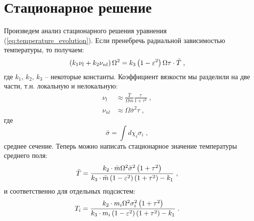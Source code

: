 \section{Стационарное решение}
Произведем анализ стационарного решения уравнения (\ref{eq:temperature_evolution}). Если пренебречь радиальной зависимостью
температуры, то получаем:
\begin{equation}
    \left(k_1\nu_{l}+k_2\nu_{nl}\right)\Omega^2=k_3\left(1-\varepsilon^2\right)\Omega\tau\cdot\bar{T}\;,
\end{equation}
где $k_1,\,k_2,\,k_3$ -- некоторые константы. Коэффициент вязкости мы разделили на две части, т.н. локальную и нелокальную:
\begin{equation}
    \begin{split}
        \nu_{l}&\approx\frac{\bar{T}}{\Omega\bar{m}}\frac{\tau}{1+\tau^2}\;,\\
        \nu_{nl}&\approx\Omega\bar{\sigma}^2\tau\;,
    \end{split}
\end{equation}
где
\begin{equation}
  \bar{\sigma}=\int d\chi_i\sigma_i\;,
\end{equation}
среднее сечение. Теперь можно написать стационарное значение температуры среднего поля:
\begin{equation}
    \bar{T} = \frac{k_2\cdot\bar{m}\Omega^2\bar{\sigma}^2\left(1+\tau^2\right)}{k_3\cdot\bar{m}\left(1-\varepsilon^2\right)\left(1+\tau^2\right)-k_1}\;,
\end{equation}
и соответственно для отдельных подсистем:
\begin{equation}
    T_{i} = \frac{k_2\cdot m_i\Omega^2\sigma_i^2\left(1+\tau^2\right)}{k_3\cdot m_i\left(1-\varepsilon^2\right)\left(1+\tau^2\right)-k_1}\;.
\end{equation}






